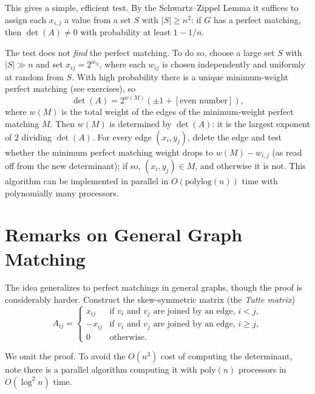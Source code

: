 
This gives a simple, efficient test. By the Schwartz--Zippel Lemma it suffices to
assign each $x_{i,j}$ a value from a set $S$ with $|S| \ge n^2$: if $G$ has a
perfect matching, then $\det(A) \neq 0$ with probability at least $1 - 1/n$.

The test does not \emph{find} the perfect matching. To do so, choose a large set
$S$ with $|S| \gg n$ and set $x_{ij} = 2^{w_{ij}}$, where each $w_{ij}$ is chosen
independently and uniformly at random from $S$. With high probability there is a
unique minimum-weight perfect matching (see exercises), so
\[
\det(A) = 2^{w(M)} \left(\pm 1 + [\text{even number}]\right),
\]
where $w(M)$ is the total weight of the edges of the minimum-weight perfect
matching $M$. Then $w(M)$ is determined by $\det(A)$: it is the largest exponent
of $2$ dividing $\det(A)$. For every edge $(x_i, y_j)$, delete the edge and test
whether the minimum perfect matching weight drops to $w(M) - w_{i,j}$ (as read off
from the new determinant); if so, $(x_i, y_j) \in M$, and otherwise it is not.
This algorithm can be implemented in parallel in $O(\mathrm{polylog}(n))$ time
with polynomially many processors.

\section{Remarks on General Graph Matching}

The idea generalizes to perfect matchings in general graphs, though the proof is
considerably harder. Construct the skew-symmetric matrix (the \emph{Tutte
matrix})
\[
A_{ij} =
\begin{cases}
x_{ij} & \text{if } v_i \text{ and } v_j \text{ are joined by an edge, } i < j, \\
-x_{ij} & \text{if } v_i \text{ and } v_j \text{ are joined by an edge, } i \ge j, \\
0 & \text{otherwise.}
\end{cases}
\]


We omit the proof. To avoid the $O(n^3)$ cost of computing the determinant, note
there is a parallel algorithm computing it with $\mathrm{poly}(n)$ processors in
$O(\log^2 n)$ time.
% 
